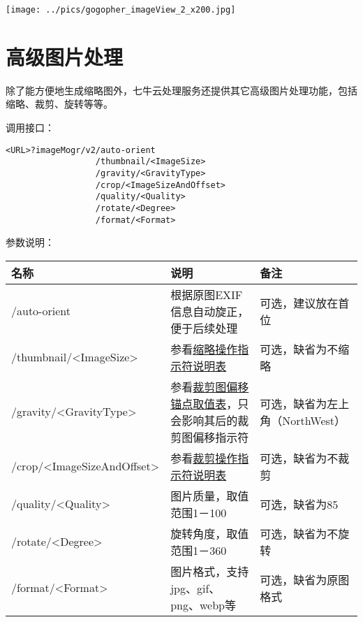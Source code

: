\documentclass[11pt, oneside]{book}
\newcommand{\qpar}[1]{
\vspace{0.25em}
\noindent
#1\par
\vspace{0.25em}
}
\newcommand{\qtable}[1]{\footnotesize\vspace{0.5em}#1\vspace{0.5em}\normalsize}
\begin{document}
\begin{CJK*}{UTF8}{song}
\begin{sample}
    \begin{center}
      \texttt{[image: ../pics/gogopher\_imageView\_2\_x200.jpg]}
    \end{center}
  \label{imageView-2-x200}
\end{sample}

\clearpage

\section{高级图片处理}

\qpar{除了能方便地生成缩略图外，七牛云处理服务还提供其它高级图片处理功能，包括缩略、裁剪、旋转等等。}
\qpar{调用接口：}
\begin{lstlisting}[basicstyle=\ttfamily\footnotesize]
<URL>?imageMogr/v2/auto-orient
                  /thumbnail/<ImageSize>
                  /gravity/<GravityType>
                  /crop/<ImageSizeAndOffset>
                  /quality/<Quality>
                  /rotate/<Degree>
                  /format/<Format>
\end{lstlisting}

\qpar{参数说明：}
\qtable{
\def\arraystretch{2}
\begin{tabular}{|l|p{13em}|p{10em}|}
\hline
名称 & 说明 & 备注\\
\hline
/auto-orient & 根据原图EXIF信息自动旋正，便于后续处理 & 可选，建议放在首位 \\
\hline
/thumbnail/\textless ImageSize\textgreater & 参看\hyperref[thumbnail-spec]{缩略操作指示符说明表} & 可选，缺省为不缩略 \\
\hline
/gravity/\textless GravityType\textgreater & 参看\hyperref[offset-anchor-spec]{裁剪图偏移锚点取值表}，只会影响其后的裁剪图偏移指示符 & 可选，缺省为左上角（NorthWest） \\
\hline
/crop/\textless ImageSizeAndOffset\textgreater & 参看\hyperref[crop-spec]{裁剪操作指示符说明表} & 可选，缺省为不裁剪 \\
\hline
/quality/\textless Quality\textgreater & 图片质量，取值范围1－100 & 可选，缺省为85 \\
\hline
/rotate/\textless Degree\textgreater & 旋转角度，取值范围1－360 & 可选，缺省为不旋转 \\
\hline
/format/\textless Format\textgreater & 图片格式，支持jpg、gif、png、webp等 & 可选，缺省为原图格式 \\
\hline
\end{tabular}
}

\clearpage


\end{CJK*}
\end{document}
